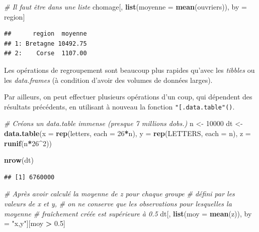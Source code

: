 \documentclass[
  11pt,
]{book}
\newenvironment{Shaded}{\begin{snugshade}}{\end{snugshade}}
\newcommand{\CommentTok}[1]{\textcolor[rgb]{0.56,0.35,0.01}{\textit{#1}}}
\newcommand{\DataTypeTok}[1]{\textcolor[rgb]{0.13,0.29,0.53}{#1}}
\newcommand{\DecValTok}[1]{\textcolor[rgb]{0.00,0.00,0.81}{#1}}
\newcommand{\FloatTok}[1]{\textcolor[rgb]{0.00,0.00,0.81}{#1}}
\newcommand{\KeywordTok}[1]{\textcolor[rgb]{0.13,0.29,0.53}{\textbf{#1}}}
\newcommand{\NormalTok}[1]{#1}
\newcommand{\OperatorTok}[1]{\textcolor[rgb]{0.81,0.36,0.00}{\textbf{#1}}}
\newcommand{\StringTok}[1]{\textcolor[rgb]{0.31,0.60,0.02}{#1}}
\numberwithin{equation}{section}
\numberwithin{countremarque}{section}
\begin{document}
\begin{Shaded}
\begin{Highlighting}[]
\CommentTok{\# Il faut être dans une liste}
\NormalTok{chomage[, }\KeywordTok{list}\NormalTok{(}\DataTypeTok{moyenne =} \KeywordTok{mean}\NormalTok{(ouvriers)), by =}\StringTok{ }\NormalTok{region]}
\end{Highlighting}
\end{Shaded}

\begin{lstlisting}
##      region  moyenne
## 1: Bretagne 10492.75
## 2:    Corse  1107.00
\end{lstlisting}

Les opérations de regroupement sont beaucoup plus rapides qu'avec les \emph{tibbles} ou les \emph{data.frames} (à condition d'avoir des volumes de données larges).

Par ailleurs, on peut effectuer plusieurs opérations d'un coup, qui dépendent des résultats précédents, en utilisant à nouveau la fonction \texttt{"{[}.data.table"()}.

\begin{Shaded}
\begin{Highlighting}[]
\CommentTok{\# Créons un data.table immense (presque 7 millions d\textquotesingle{}obs.)}
\NormalTok{n \textless{}{-}}\StringTok{ }\DecValTok{10000}
\NormalTok{dt \textless{}{-}}\StringTok{ }\KeywordTok{data.table}\NormalTok{(}\DataTypeTok{x =} \KeywordTok{rep}\NormalTok{(letters, }\DataTypeTok{each =} \DecValTok{26}\OperatorTok{*}\NormalTok{n),}
                 \DataTypeTok{y =} \KeywordTok{rep}\NormalTok{(LETTERS, }\DataTypeTok{each =}\NormalTok{ n),}
                 \DataTypeTok{z =} \KeywordTok{runif}\NormalTok{(n}\OperatorTok{*}\DecValTok{26}\OperatorTok{\^{}}\DecValTok{2}\NormalTok{))}

\KeywordTok{nrow}\NormalTok{(dt)}
\end{Highlighting}
\end{Shaded}

\begin{lstlisting}
## [1] 6760000
\end{lstlisting}

\begin{Shaded}
\begin{Highlighting}[]
\CommentTok{\# Après avoir calculé la moyenne de z pour chaque groupe}
\CommentTok{\# défini par les valeurs de x et y,}
\CommentTok{\# on ne conserve que les observations pour lesquelles la moyenne}
\CommentTok{\# fraîchement créée est supérieure à 0.5}
\NormalTok{dt[, }\KeywordTok{list}\NormalTok{(}\DataTypeTok{moy =} \KeywordTok{mean}\NormalTok{(z)), by =}\StringTok{ "x,y"}\NormalTok{][moy }\OperatorTok{\textgreater{}}\StringTok{ }\FloatTok{0.5}\NormalTok{]}
\end{Highlighting}
\end{Shaded}
\end{document}
